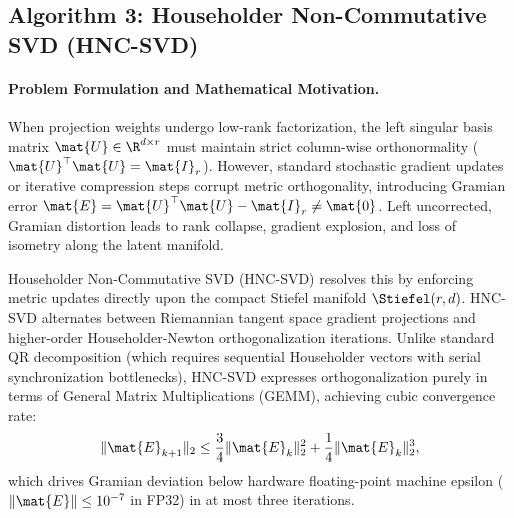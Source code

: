 \subsection{Algorithm 3: Householder Non-Commutative SVD (HNC-SVD)}
\label{subsec:alg_hnc_svd}

\paragraph{Problem Formulation and Mathematical Motivation.}
When projection weights undergo low-rank factorization, the left singular basis matrix $\mat{U} \in \R^{d \times r}$ must maintain strict column-wise orthonormality ($\mat{U}^\top \mat{U} = \mat{I}_r$). However, standard stochastic gradient updates or iterative compression steps corrupt metric orthogonality, introducing Gramian error $\mat{E} = \mat{U}^\top \mat{U} - \mat{I}_r \ne \mat{0}$. Left uncorrected, Gramian distortion leads to rank collapse, gradient explosion, and loss of isometry along the latent manifold.

Householder Non-Commutative SVD (HNC-SVD) resolves this by enforcing metric updates directly upon the compact Stiefel manifold $\Stiefel(r, d)$. HNC-SVD alternates between Riemannian tangent space gradient projections and higher-order Householder-Newton orthogonalization iterations. Unlike standard QR decomposition (which requires sequential Householder vectors with serial synchronization bottlenecks), HNC-SVD expresses orthogonalization purely in terms of General Matrix Multiplications (GEMM), achieving cubic convergence rate:
\begin{equation}
    \|\mat{E}_{k+1}\|_2 \le \frac{3}{4} \|\mat{E}_k\|_2^2 + \frac{1}{4} \|\mat{E}_k\|_2^3,
    \label{eq:hnc_cubic_bound_alg}
\end{equation}
which drives Gramian deviation below hardware floating-point machine epsilon ($\|\mat{E}\| \le 10^{-7}$ in FP32) in at most three iterations.

